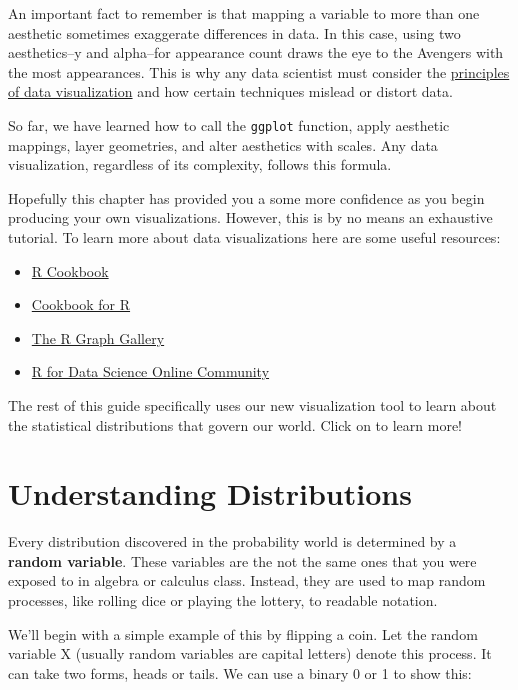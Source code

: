 \documentclass[
]{book}
\providecommand{\tightlist}{%
  \setlength{\itemsep}{0pt}\setlength{\parskip}{0pt}}
\begin{document}
An important fact to remember is that mapping a variable to more than one aesthetic sometimes exaggerate differences in data. In this case, using two aesthetics--y and alpha--for appearance count draws the eye to the Avengers with the most appearances. This is why any data scientist must consider the \href{https://socviz.co/index.html\#preface}{principles of data visualization} and how certain techniques mislead or distort data.

So far, we have learned how to call the \texttt{ggplot} function, apply aesthetic mappings, layer geometries, and alter aesthetics with scales. Any data visualization, regardless of its complexity, follows this formula.

Hopefully this chapter has provided you a some more confidence as you begin producing your own visualizations. However, this is by no means an exhaustive tutorial. To learn more about data visualizations here are some useful resources:

\begin{itemize}
\tightlist
\item
  \href{https://www.amazon.com/gp/product/0596809158/ref=as_li_tf_tl?ie=UTF8\&camp=1789\&creative=9325\&creativeASIN=0596809158\&linkCode=as2\&tag=cooforr09-20}{R Cookbook}
\item
  \href{http://www.cookbook-r.com/}{Cookbook for R}
\item
  \href{https://www.r-graph-gallery.com/index.html}{The R Graph Gallery}
\item
  \href{https://www.rfordatasci.com/}{R for Data Science Online Community}
\end{itemize}

The rest of this guide specifically uses our new visualization tool to learn about the statistical distributions that govern our world. Click on to learn more!

\hypertarget{Distributions}{%
\chapter{Understanding Distributions}\label{Distributions}}

Every distribution discovered in the probability world is determined by a \textbf{random variable}. These variables are the not the same ones that you were exposed to in algebra or calculus class. Instead, they are used to map random processes, like rolling dice or playing the lottery, to readable notation.

We'll begin with a simple example of this by flipping a coin. Let the random variable X (usually random variables are capital letters) denote this process. It can take two forms, heads or tails. We can use a binary 0 or 1 to show this:
\end{document}

